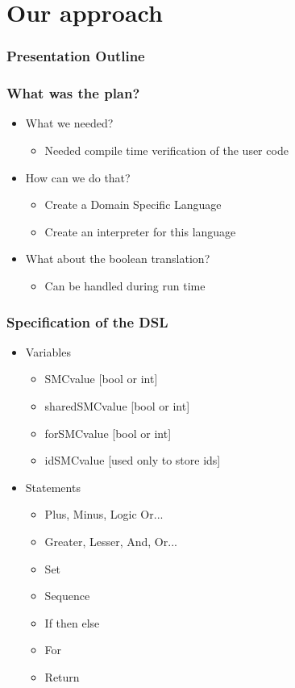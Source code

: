 \documentclass{beamer}
\begin{document}
\section{Our approach}
\begin{frame}[fragile]
\frametitle{Presentation Outline}
\tableofcontents[currentsection]
\end{frame}

\begin{frame}[fragile]
\frametitle{What was the plan?}
\begin{itemize}
\item What we needed?
\begin{itemize}
\item Needed compile time verification of the user code
\end{itemize}
\item How can we do that?
\begin{itemize}
\item Create a Domain Specific Language
\item Create an interpreter for this language
\end{itemize}
\item What about the boolean translation?
\begin{itemize}
\item Can be handled during run time
\end{itemize}
\end{itemize}
\end{frame}


\begin{frame}[fragile]
\frametitle{Specification of the DSL}
\begin{itemize}
\item Variables
\begin{itemize}
\item SMCvalue [bool or int]
\item sharedSMCvalue [bool or int]
\item forSMCvalue [bool or int]
\item idSMCvalue [used only to store ids]
\end{itemize}
\item Statements
\begin{itemize}
\item Plus, Minus, Logic Or...
\item Greater, Lesser, And, Or...
\item Set
\item Sequence
\item If then else
\item For
\item Return
\end{itemize}
\end{itemize}
\end{frame}
\end{document}
